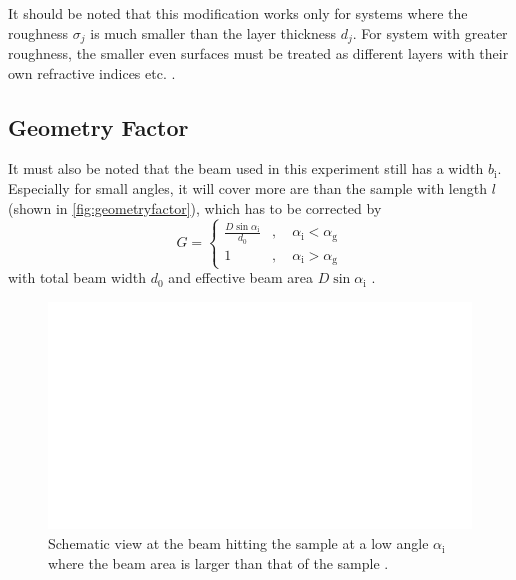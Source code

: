 It should be noted that this modification works only for systems where the roughness $\sigma_j$ is much smaller than the layer thickness $d_j$.
For system with greater roughness, the smaller even surfaces must be treated as different layers with their own refractive indices etc. \cite{tolan}.

\subsection{Geometry Factor}

It must also be noted that the beam used in this experiment still has a width $b_\text{i}$.
Especially for small angles, it will cover more are than the sample with length $l$ (shown in \autoref{fig:geometryfactor}), 
which has to be corrected by
\begin{equation}
    G = \begin{cases}
        \frac{D \sin\alpha_\text{i}}{d_0}&, \quad \alpha_ \text{i} < \alpha_\text{g} \\
        1&,\quad \alpha_\text{i} > \alpha_\text{g}
    \end{cases}
\end{equation}
with total beam width $d_0$ and effective beam area $D \sin\alpha_\text{i}$ \cite{v44}.

\begin{figure}[H]
    \centering
    \includegraphics{figures/beam_width.pdf}
    \caption{Schematic view at the beam hitting the sample at a low angle $\alpha_\text{i}$ where the beam area is larger than that of the sample \cite{v44}.}
    \label{fig:geometryfactor}
\end{figure}




